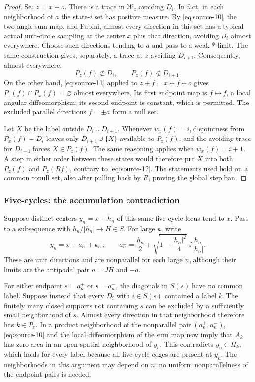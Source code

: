 \begin{proof}
Set $z=x+a$.  There is a trace in $\mathcal W_z$ avoiding $D_i$.
In fact, in each neighborhood of $a$ the state-$i$ set has positive
measure.  By \eqref{eq:source-10}, the two-angle sum map, and Fubini,
almost every direction in this set has a typical actual unit-circle
sampling at the center $x$ plus that direction, avoiding $D_i$
almost everywhere.  Choose such directions tending to $a$ and pass
to a weak-* limit.  The same construction gives, separately, a trace
at $z$ avoiding $D_{i+1}$.  Consequently, almost everywhere,
\[
 P_z(f)\not\subset D_i,\qquad P_z(f)\not\subset D_{i+1}.
\]
On the other hand, \eqref{eq:source-11} applied to
$z+f=x+f+a$ gives
$P_z(f)\cap P_x(f)=\varnothing$ almost everywhere.  Its first
endpoint map is $f\mapsto f$, a local angular diffeomorphism; its
second endpoint is constant, which is permitted.  The excluded
parallel directions $f=\pm a$ form a null set.

Let $X$ be the label outside $D_i\cup D_{i+1}$.  Whenever $w_x(f)=i$,
disjointness from $P_x(f)=D_i$ leaves only $D_{i+1}\cup\{X\}$
available to $P_z(f)$, and the avoiding trace for $D_{i+1}$ forces
$X\in P_z(f)$.  The same reasoning applies when $w_x(f)=i+1$.
A step in either order between these states would therefore put
$X$ into both $P_z(f)$ and $P_z(Rf)$, contrary to
\eqref{eq:source-12}.  The statements used hold on a common conull
set, also after pulling back by $R$, proving the global step ban.
\end{proof}

\subsubsection{Five-cycles: the accumulation contradiction}

Suppose distinct centers $y_n=x+h_n$ of this same five-cycle locus
tend to $x$.  Pass to a subsequence with $h_n/|h_n|\to H\in S$.
For large $n$, write
\[
 y_n=x+a_n^++a_n^-,\qquad
 a_n^\pm=\frac{h_n}{2}
   \pm\sqrt{1-\frac{|h_n|^2}{4}}\,J\frac{h_n}{|h_n|}.
\]
These are unit directions and are nonparallel for each large $n$,
although their limits are the antipodal pair $a=JH$ and $-a$.

For either endpoint $s=a_n^+$ or $s=a_n^-$, the diagonals in $S(s)$
have no common label.  Suppose instead that every $D_i$ with
$i\in S(s)$ contained a label $k$.  The finitely many closed
supports not containing $s$ can be excluded by a sufficiently small
neighborhood of $s$.  Almost every direction in that neighborhood
therefore has $k\in P_x$.  In a product neighborhood of the
nonparallel pair $(a_n^+,a_n^-)$, \eqref{eq:source-10} and the local
diffeomorphism of the sum map now imply that $A_k$ has zero area
in an open spatial neighborhood of $y_n$.  This contradicts
$y_n\in H_k$, which holds for every label because all five cycle
edges are present at $y_n$.  The neighborhoods in this argument may
depend on $n$; no uniform nonparallelness of the endpoint pairs is
needed.

